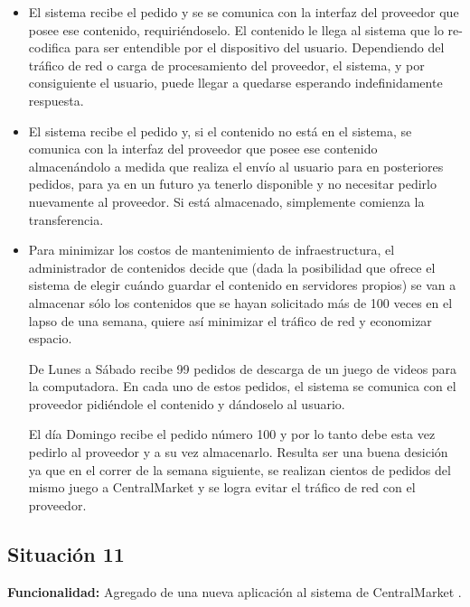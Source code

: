 \documentclass[11pt, a4paper, spanish]{article}
\begin{document}
	\begin{itemize}
	
	\item{ El sistema recibe el pedido y se se comunica con la interfaz del proveedor que posee ese contenido, requiri\'endoselo. El contenido le 
   llega al sistema que lo re-codifica para ser entendible por el dispositivo del usuario. Dependiendo del tr\'afico de red o carga de procesamiento 
   del proveedor, el sistema, y por consiguiente el usuario, puede llegar a quedarse esperando indefinidamente respuesta.}

	\item{ El sistema recibe el pedido y, si el contenido no est\'a en el sistema, se comunica con la interfaz del proveedor que posee ese 
   contenido almacen\'andolo a medida que realiza el env\'io al usuario para en posteriores pedidos, para ya en un futuro ya tenerlo disponible y no 
   necesitar pedirlo nuevamente al proveedor. Si est\'a almacenado, simplemente comienza la transferencia.}

	\item{ Para minimizar los costos de mantenimiento de infraestructura, el administrador de contenidos decide que (dada la posibilidad que ofrece 
   el sistema de elegir cu\'ando guardar el contenido en servidores propios) se van a almacenar s\'olo los contenidos que se hayan solicitado m\'as de 
   100 veces en el lapso de una semana, quiere as\'i minimizar el tr\'afico de red y economizar espacio.}

	De Lunes a S\'abado recibe 99 pedidos de descarga de un juego de videos para la computadora. En cada uno de estos pedidos, el sistema se 
   comunica con el proveedor pidi\'endole el contenido y d\'andoselo al usuario.

	El d\'ia Domingo recibe el pedido n\'umero 100 y por lo tanto debe esta vez pedirlo al proveedor y a su vez almacenarlo. Resulta ser una buena 
   desici\'on ya que en el correr de la semana siguiente, se realizan cientos de pedidos del mismo juego a CentralMarket y se logra evitar el tr\'afico 
   de red con el proveedor.

	\end{itemize}

\subsection{Situaci\'on 11}

	\textbf{Funcionalidad:} Agregado de una nueva aplicaci\'on al sistema de CentralMarket .\\
\end{document}
